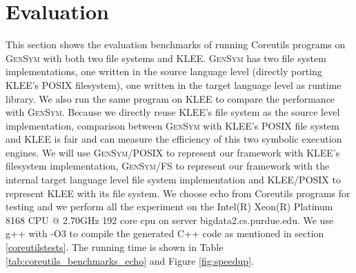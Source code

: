 \documentclass[sigplan, nonacm]{acmart}\settopmatter{printfolios=true,printccs=false,printacmref=false}
\newcommand{\tool}{\textsc{GenSym}\xspace}
\begin{document}
\section{Evaluation}\label{evaluation}
This section shows the evaluation benchmarks of running Coreutils programs on \tool with both two file systems and KLEE. \tool has two file system implementations, one written in the source language level (directly porting KLEE's POSIX filesystem), one written in the target language level as runtime library. We also run the same program on KLEE to compare the performance with \tool. Because we directly reuse KLEE's file system as the source level implementation, comparison between \tool with KLEE's POSIX file system and KLEE is fair and can measure the efficiency of this two symbolic execution engines. We will use \tool/POSIX to represent our framework with KLEE's filesystem implementation, \tool/FS to represent our framework with the internal target language level file system implementation and KLEE/POSIX to represent KLEE with its file system. We choose echo from Coreutils programs for testing and we perform all the experiment on the Intel(R) Xeon(R) Platinum 8168 CPU @ 2.70GHz 192 core cpu on server bigdata2.cs.purdue.edu. We use g++ with -O3 to compile the generated C++ code as mentioned in section \ref{coreutilstests}. The running time is shown in Table \ref{tab:coreutils_benchmarks_echo} and Figure \ref{fig:speedup}.\par
\end{document}
